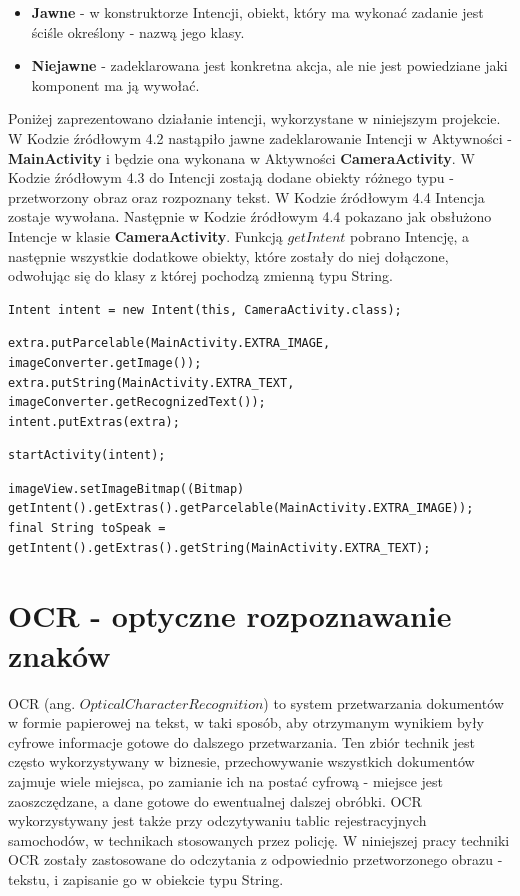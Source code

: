 \documentclass[eng,oneside]{mgr}
\begin{document}
\begin{itemize}
\item \textbf{Jawne} - w konstruktorze Intencji, obiekt, który ma wykonać zadanie jest ściśle określony - nazwą jego klasy.
\item \textbf{Niejawne} - zadeklarowana jest konkretna akcja, ale nie jest powiedziane jaki komponent ma ją wywołać\cite{damianchodorek}.
\end{itemize}
\par Poniżej zaprezentowano działanie intencji, wykorzystane w niniejszym projekcie. W Kodzie źródłowym 4.2 nastąpiło jawne zadeklarowanie Intencji w Aktywności - \textbf{MainActivity} i będzie ona wykonana w Aktywności \textbf{CameraActivity}. W Kodzie źródłowym 4.3 do Intencji zostają dodane obiekty różnego typu - przetworzony obraz oraz rozpoznany tekst. W Kodzie źródłowym 4.4 Intencja zostaje wywołana. Następnie w Kodzie źródłowym 4.4 pokazano jak obsłużono Intencje w klasie \textbf{CameraActivity}. Funkcją $getIntent$ pobrano Intencję, a następnie wszystkie dodatkowe obiekty, które zostały do niej dołączone, odwołując się do klasy z której pochodzą zmienną typu String. 
\begin{lstlisting}[caption={Zadeklarowanie intencji.}]
Intent intent = new Intent(this, CameraActivity.class);
\end{lstlisting}
\begin{lstlisting}[caption={Przekazanie obiektów różnego typu w intencji.}]
extra.putParcelable(MainActivity.EXTRA_IMAGE, imageConverter.getImage());
extra.putString(MainActivity.EXTRA_TEXT, imageConverter.getRecognizedText());
intent.putExtras(extra);
\end{lstlisting}
\begin{lstlisting}[caption={Wywołanie intencji.}]
startActivity(intent);
\end{lstlisting}
\begin{lstlisting}[caption={Obsługa intencji w klasie w którym ma zostać wykonana.}]
imageView.setImageBitmap((Bitmap) getIntent().getExtras().getParcelable(MainActivity.EXTRA_IMAGE));
final String toSpeak = getIntent().getExtras().getString(MainActivity.EXTRA_TEXT);
\end{lstlisting}
\section{OCR - optyczne rozpoznawanie znaków}
OCR (ang. $Optical Character Recognition$) to system przetwarzania dokumentów w formie papierowej na tekst, w taki sposób, aby otrzymanym wynikiem były cyfrowe informacje gotowe do dalszego przetwarzania. Ten zbiór technik jest często wykorzystywany w biznesie, przechowywanie wszystkich dokumentów zajmuje wiele miejsca, po zamianie ich na postać cyfrową - miejsce jest zaoszczędzane, a dane gotowe do ewentualnej dalszej obróbki\cite{dokument}. OCR wykorzystywany jest także przy odczytywaniu tablic rejestracyjnych samochodów, w technikach stosowanych przez policję. \cite{car} W niniejszej pracy techniki OCR zostały zastosowane do odczytania z odpowiednio przetworzonego obrazu - tekstu, i zapisanie go w obiekcie typu String.
\end{document}
